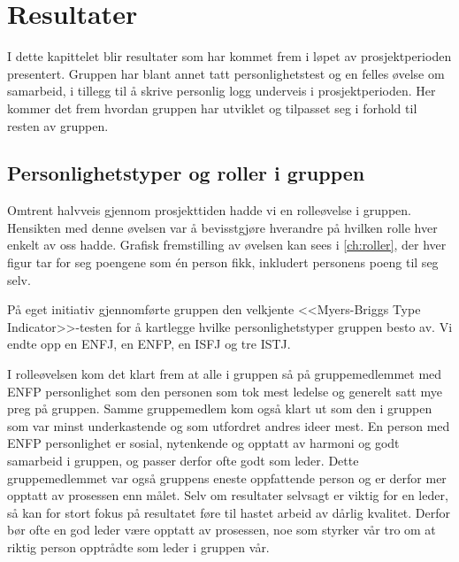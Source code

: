 
\chapter{Resultater} %

\label{ch:resultater} %



I dette kapittelet blir resultater som har kommet frem i løpet av prosjektperioden presentert. Gruppen har blant annet tatt personlighets\-test og en felles øvelse om samarbeid, i tillegg til å skrive personlig logg underveis i prosjektperioden. Her kommer det frem hvordan gruppen har utviklet og tilpasset seg i forhold til resten av gruppen.



\section{Personlighetstyper og roller i gruppen}

Omtrent halvveis gjennom prosjekttiden hadde vi en rolleøvelse i gruppen. Hensikten med denne øvelsen var å bevisstgjøre hverandre på hvilken rolle hver enkelt av oss hadde. Grafisk fremstilling av øvelsen kan sees i \autoref{ch:roller}, der hver figur tar for seg poengene som én person fikk, inkludert personens poeng til seg selv.

På eget initiativ gjennomførte gruppen den velkjente <<Myers-Briggs Type Indicator>>-testen for å kartlegge hvilke personlighetstyper gruppen besto av. Vi endte opp en ENFJ, en ENFP, en ISFJ og tre ISTJ.

I rolleøvelsen kom det klart frem at alle i gruppen så på gruppemedlemmet med ENFP personlighet som den personen som tok mest ledelse og generelt satt mye preg på gruppen. Samme gruppemedlem kom også klart ut som den i gruppen som var minst underkastende og som utfordret andres ideer mest. En person med ENFP personlighet er sosial, nytenkende og opptatt av harmoni og godt samarbeid i gruppen, og passer derfor ofte godt som leder. Dette gruppemedlemmet var også gruppens eneste oppfattende person og er derfor mer opptatt av prosessen enn målet. Selv om resultater selvsagt er viktig for en leder, så kan for stort fokus på resultatet føre til hastet arbeid av dårlig kvalitet. Derfor bør ofte en god leder være opptatt av prosessen, noe som styrker vår tro om at riktig person opptrådte som leder i gruppen vår.

